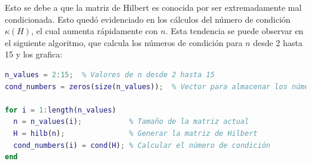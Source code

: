 \begin{homeworkProblem}
\begin{solucion}
\begin{enumerate}[a)]
\begin{enumerate}[1)]
              Esto se debe a que la matriz de Hilbert es conocida por ser extremadamente mal condicionada. Esto quedó evidenciado en los cálculos del número de condición \( \kappa(H) \), el cual aumenta rápidamente con \( n \). Esta tendencia se puede observar en el siguiente algoritmo, que calcula los números de condición para \( n \) desde 2 hasta 15 y los grafica:
              \begin{lstlisting}[language=matlab]
% Cálculo y graficación del número de condición de la matriz de Hilbert
n_values = 2:15;  % Valores de n desde 2 hasta 15
cond_numbers = zeros(size(n_values));  % Vector para almacenar los números de condición
                
for i = 1:length(n_values)
  n = n_values(i);           % Tamaño de la matriz actual
  H = hilb(n);               % Generar la matriz de Hilbert
  cond_numbers(i) = cond(H); % Calcular el número de condición
end
                

\end{lstlisting}
\end{enumerate}
\end{enumerate}
\end{solucion}
\end{homeworkProblem}
